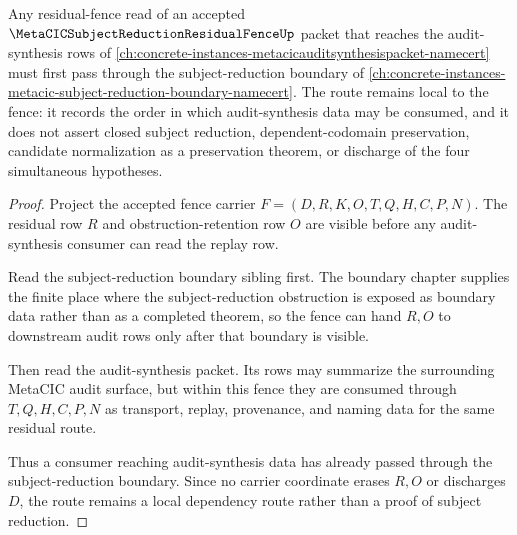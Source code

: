 \begin{theorem}
\label{thm:metacic-subject-reduction-residual-fence-orphan-link-route}
Any residual-fence read of an accepted $\MetaCICSubjectReductionResidualFenceUp$ packet that reaches the audit-synthesis rows of \autoref{ch:concrete-instances-metacicauditsynthesispacket-namecert} must first pass through the subject-reduction boundary of \autoref{ch:concrete-instances-metacic-subject-reduction-boundary-namecert}. The route remains local to the fence: it records the order in which audit-synthesis data may be consumed, and it does not assert closed subject reduction, dependent-codomain preservation, candidate normalization as a preservation theorem, or discharge of the four simultaneous hypotheses.
\end{theorem}
\begin{proof}
Project the accepted fence carrier $F=(D,R,K,O,T,Q,H,C,P,N)$. The residual row $R$ and obstruction-retention row $O$ are visible before any audit-synthesis consumer can read the replay row.

Read the subject-reduction boundary sibling first. The boundary chapter supplies the finite place where the subject-reduction obstruction is exposed as boundary data rather than as a completed theorem, so the fence can hand $R,O$ to downstream audit rows only after that boundary is visible.

Then read the audit-synthesis packet. Its rows may summarize the surrounding MetaCIC audit surface, but within this fence they are consumed through $T,Q,H,C,P,N$ as transport, replay, provenance, and naming data for the same residual route.

Thus a consumer reaching audit-synthesis data has already passed through the subject-reduction boundary. Since no carrier coordinate erases $R,O$ or discharges $D$, the route remains a local dependency route rather than a proof of subject reduction.
\end{proof}



